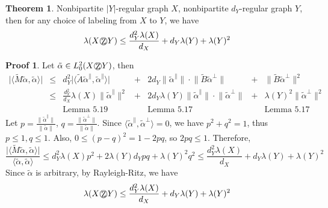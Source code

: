 \documentclass{book}
\newcommand{\zigzag}{$\bigcirc$\kern-0.77em\raisebox{-.16ex}{\small Z}$\,$}
\newcommand{\inner}[1]{\langle #1 \rangle}
\newcommand{\norm}[1]{\lVert #1 \rVert}
\newcommand{\abs}[1]{\lvert #1 \rvert }
\theoremstyle{definition}
\newtheorem{theorem}[lemma]{Theorem}
\theoremstyle{remarkstyle}
\newtheorem*{myproof}{Proof}%
\begin{document}
\begin{theorem}
    Nonbipartite $\abs{Y}$-regular graph $X$, nonbipartite $d_Y$-regular graph $Y$, then for any choice of labeling from $X$ to $Y$, we have 
    $$
    \lambda(X\textrm{\zigzag}Y)\le \frac{d^2_Y\lambda(X)}{d_X}+d_Y\lambda(Y)+\lambda(Y)^2
    $$
\end{theorem}
\begin{myproof}
    Let $\tilde{\alpha} \in L^{2}_0(X\textrm{\zigzag}Y) $, then 
    $$
    \begin{array}{ccccccc}
         \abs{\inner{\tilde{M}\tilde{\alpha}, \tilde{\alpha}}} 
         &\le&  
         d^2_{Y}\abs{\inner{\tilde{A}\tilde{\alpha}^{\parallel}, \tilde{\alpha}^{\parallel} } } 
         & + & 
         2d_Y\norm{\tilde{\alpha}^{\parallel} }\cdot \norm{\tilde{B}\tilde{\alpha}^{\perp}} 
         &+& 
         \norm{\tilde{B}\tilde{\alpha}^{\perp}}^{2}  \\[5pt]
         &\le&
         \frac{d^2_Y}{d_X}\lambda(X)\norm{\tilde{\alpha}^{\parallel}}^2
         & + &
         2d_Y\lambda(Y)\norm{\tilde{\alpha}^{\parallel}} \cdot \norm{\tilde{\alpha}^{\perp}} 
         & + &
         \lambda(Y)^2\norm{\tilde{\alpha}^{\perp}}^2 \\[5pt]
         & &
         \textrm{Lemma 5.19} 
         & & 
         \textrm{Lemma 5.17}
         & & 
         \textrm{Lemma 5.17}
    \end{array}
    $$
    Let $p=\frac{\norm{\tilde{\alpha}^{\parallel}}}{\norm{\tilde{\alpha}}}$, $q=\frac{\norm{\tilde{\alpha}^{\perp}}}{\norm{\tilde{\alpha}}}$. Since $\inner{\tilde{\alpha}^{\parallel}, \tilde{\alpha}^{\perp}}=0$, we have $p^2+q^2=1$, thus $p\le1, q\le1$. Also, $0\le (p-q)^2=1-2pq$, so $2pq\le1$. Therefore, 
    $$
    \frac{\abs{\inner{\tilde{M}\tilde{\alpha}, \tilde{\alpha}}}}{\inner{\tilde{\alpha}, \tilde{\alpha}}} \le d^2_{Y}\lambda(X)p^2 + 2\lambda(Y)d_Ypq + \lambda(Y)^2q^2 \le \frac{d^2_Y\lambda(X)}{d_X}+d_Y\lambda(Y)+\lambda(Y)^2
    $$
    Since $\tilde{\alpha}$ is arbitrary, by Rayleigh-Ritz, we have
    $$
    \lambda(X\textrm{\zigzag}Y)\le \frac{d^2_Y\lambda(X)}{d_X}+d_Y\lambda(Y)+\lambda(Y)^2
    $$
    \newline
\end{myproof}
\end{document}

